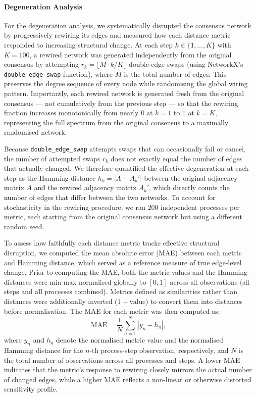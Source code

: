 \paragraph{Degeneration Analysis}

For the degeneration analysis, we systematically disrupted the consensus network by progressively rewiring its edges and measured how each distance metric responded to increasing structural change. At each step $k \in \{1,\ldots,K\}$ with $K=100$, a rewired network was generated independently from the original consensus by attempting $r_k = \lfloor M \cdot k / K \rfloor$ double-edge swaps (using NetworkX's \texttt{double\_edge\_swap} function), where $M$ is the total number of edges. This preserves the degree sequence of every node while randomising the global wiring pattern. Importantly, each rewired network is generated fresh from the original consensus — not cumulatively from the previous step — so that the rewiring fraction increases monotonically from nearly $0$ at $k=1$ to $1$ at $k=K$, representing the full spectrum from the original consensus to a maximally randomised network.

Because \texttt{double\_edge\_swap} attempts swaps that can occasionally fail or cancel, the number of attempted swaps $r_k$ does not exactly equal the number of edges that actually changed. We therefore quantified the effective degeneration at each step as the Hamming distance $h_k = |A - A_k'|$ between the original adjacency matrix $A$ and the rewired adjacency matrix $A_k'$, which directly counts the number of edges that differ between the two networks. To account for stochasticity in the rewiring procedure, we ran 200 independent processes per metric, each starting from the original consensus network but using a different random seed.

To assess how faithfully each distance metric tracks effective structural disruption, we computed the mean absolute error (MAE) between each metric and Hamming distance, which served as a reference measure of true edge-level change. Prior to computing the MAE, both the metric values and the Hamming distances were min-max normalised globally to $[0,1]$ across all observations (all steps and all processes combined). Metrics defined as similarities rather than distances were additionally inverted ($1 - \text{value}$) to convert them into distances before normalisation. The MAE for each metric was then computed as:
$$\mathrm{MAE}=\frac{1}{N}\sum_{n=1}^N |y_n - h_n|,$$
where $y_n$ and $h_n$ denote the normalised metric value and the normalised Hamming distance for the $n$-th process-step observation, respectively, and $N$ is the total number of observations across all processes and steps. A lower MAE indicates that the metric's response to rewiring closely mirrors the actual number of changed edges, while a higher MAE reflects a non-linear or otherwise distorted sensitivity profile.
